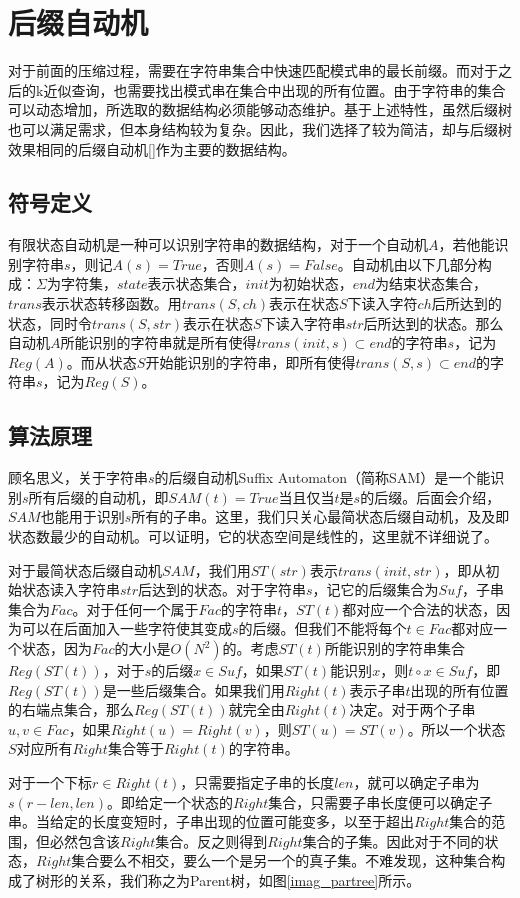 ﻿\documentclass{sysuthesis}
\begin{document}
\chapter{后缀自动机}
对于前面的压缩过程，需要在字符串集合中快速匹配模式串的最长前缀。而对于之后的k近似查询，也需要找出模式串在集合中出现的所有位置。由于字符串的集合可以动态增加，所选取的数据结构必须能够动态维护。基于上述特性，虽然后缀树也可以满足需求，但本身结构较为复杂。因此，我们选择了较为简洁，却与后缀树效果相同的后缀自动机[]作为主要的数据结构。



\section{符号定义}
有限状态自动机是一种可以识别字符串的数据结构，对于一个自动机$A$，若他能识别字符串$s$，则记$A(s) = True$，否则$A(s) = False$。自动机由以下几部分构成：$\Sigma$为字符集，$state$表示状态集合，$init$为初始状态，$end$为结束状态集合，$trans$表示状态转移函数。用$trans(S, ch)$表示在状态$S$下读入字符$ch$后所达到的状态，同时令$trans(S, str)$表示在状态$S$下读入字符串$str$后所达到的状态。那么自动机$A$所能识别的字符串就是所有使得$trans(init, s) \subset end$的字符串$s$，记为$Reg(A)$。而从状态$S$开始能识别的字符串，即所有使得$trans(S, s) \subset end$的字符串$s$，记为$Reg(S)$。



\section{算法原理}
顾名思义，关于字符串$s$的后缀自动机Suffix Automaton（简称SAM）是一个能识别$s$所有后缀的自动机，即$SAM(t) = True$当且仅当$t$是$s$的后缀。后面会介绍，$SAM$也能用于识别$s$所有的子串。这里，我们只关心最简状态后缀自动机，及及即状态数最少的自动机。可以证明，它的状态空间是线性的，这里就不详细说了。\par
对于最简状态后缀自动机$SAM$，我们用$ST(str)$表示$trans(init, str)$，即从初始状态读入字符串$str$后达到的状态。对于字符串$s$，记它的后缀集合为$Suf$，子串集合为$Fac$。对于任何一个属于$Fac$的字符串$t$，$ST(t)$都对应一个合法的状态，因为可以在后面加入一些字符使其变成$s$的后缀。但我们不能将每个$t \in Fac$都对应一个状态，因为$Fac$的大小是$O(N^2)$的。考虑$ST(t)$所能识别的字符串集合$Reg(ST(t))$，对于$s$的后缀$x \in Suf$，如果$ST(t)$能识别$x$，则$t \circ x \in Suf$，即$Reg(ST(t))$是一些后缀集合。如果我们用$Right(t)$表示子串$t$出现的所有位置的右端点集合，那么$Reg(ST(t))$就完全由$Right(t)$决定。对于两个子串$u, v \in Fac$，如果$Right(u) = Right(v)$，则$ST(u) = ST(v)$。所以一个状态$S$对应所有$Right$集合等于$Right(t)$的字符串。\par
对于一个下标$r \in Right(t)$，只需要指定子串的长度$len$，就可以确定子串为$s(r - len, len)$。即给定一个状态的$Right$集合，只需要子串长度便可以确定子串。当给定的长度变短时，子串出现的位置可能变多，以至于超出$Right$集合的范围，但必然包含该$Right$集合。反之则得到$Right$集合的子集。因此对于不同的状态，$Right$集合要么不相交，要么一个是另一个的真子集。不难发现，这种集合构成了树形的关系，我们称之为Parent树，如图\ref{imag_partree}所示。\par
\end{document}

